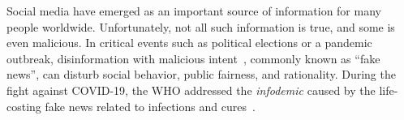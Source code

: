 \documentclass[sigconf,anonymous]{acmart}
\theoremstyle{definition}
\theoremstyle{hypothesis}
\begin{document}
Social media have emerged as an important source of information for many people worldwide. Unfortunately, not all such information is true, and some is even malicious. 
In critical events such as political elections or a pandemic outbreak, disinformation with malicious intent~\cite{shu2017fake}, commonly known as ``fake news'', can disturb social behavior, public fairness, and rationality. During the fight against COVID-19, the WHO addressed the \textit{infodemic} caused by the life-costing fake news related to infections and cures~\cite{thomas_2020}. 
\end{document}
